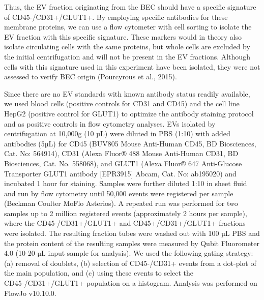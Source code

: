 \documentclass[authordate, empirical]{jote-new-article}
\begin{document}
	Thus, the EV fraction originating from the BEC should have a specific signature of CD45-/CD31+/GLUT1+. By employing specific antibodies for these membrane proteins, we can use a flow cytometer with cell sorting to isolate the EV fraction with this specific signature. These markers would in theory also isolate circulating cells with the same proteins, but whole cells are excluded by the initial centrifugation and will not be present in the EV fractions. Although cells with this signature used in this experiment have been isolated, they were not assessed to verify BEC origin (Pourcyrous et al., 2015).



	Since there are no EV standards with known antibody status readily available, we used blood cells (positive controls for CD31 and CD45) and the cell line HepG2 (positive control for GLUT1) to optimize the antibody staining protocol and as positive controls in flow cytometry analyses. EVs isolated by centrifugation at 10,000g (10 µL) were diluted in PBS (1:10) with added antibodies (5µL) for CD45 (BUV805 Mouse Anti-Human CD45, BD Biosciences, Cat. No: 564914), CD31 (Alexa Fluor® 488 Mouse Anti-Human CD31, BD Biosciences, Cat. No. 558068), and GLUT1 (Alexa Fluor® 647 Anti-Glucose Transporter GLUT1 antibody [EPR3915] Abcam, Cat. No: ab195020) and incubated 1 hour for staining. Samples were further diluted 1:10 in sheet fluid and run by flow cytometry until 50,000 events were registered per sample (Beckman Coulter MoFlo Asterios). A repeated run was performed for two samples up to 2 million registered events (approximately 2 hours per sample), where the CD45-/CD31+/GLUT1+ and CD45+/CD31+/GLUT1+ fractions were isolated. The resulting fraction tubes were washed out with 100 µL PBS and the protein content of the resulting samples were measured by Qubit Fluorometer 4.0 (10-20 µL input sample for analysis). We used the following gating strategy: (a) removal of doublets, (b) selection of CD45-/CD31+ events from a dot-plot of the main population, and (c) using these events to select the CD45-/CD31+/GLUT1+ population on a histogram. Analysis was performed on FlowJo v10.10.0.
\end{document}
